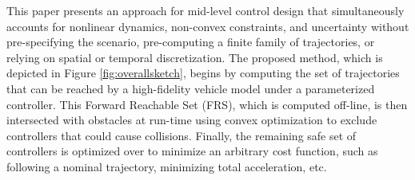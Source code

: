 This paper presents an approach for mid-level control design that simultaneously accounts for nonlinear dynamics, non-convex constraints, and uncertainty without pre-specifying the scenario, pre-computing a finite family of trajectories, or relying on spatial or temporal discretization. 
The proposed method, which is depicted in Figure \ref{fig:overallsketch}, begins by computing the set of trajectories that can be reached by a high-fidelity vehicle model under a parameterized controller.
This Forward Reachable Set (FRS), which is computed off-line, is then intersected with obstacles at run-time using convex optimization to exclude controllers that could cause collisions. 
Finally, the remaining safe set of controllers is optimized over to minimize an arbitrary cost function, such as following a nominal trajectory, minimizing total acceleration, etc.





